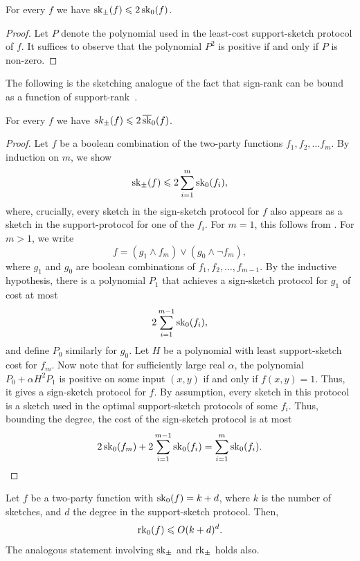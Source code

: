 \documentclass{article}
\begin{document}
\begin{boxproposition}\label{prop:support-to-sign}
    For every $f$ we have $\operatorname{sk}_\pm(f) \leqslant 2\operatorname{sk}_0(f)$.
\end{boxproposition}

\begin{proof}
    Let $P$ denote the polynomial used in the least-cost support-sketch protocol of $f$. It suffices to observe that the polynomial $P^2$ is positive if and only if $P$ is non-zero.
\end{proof}

The following is the sketching analogue of the fact that sign-rank can be bound as a function of support-rank~\cite[Lemma II.3]{GHIS25}.

\begin{boxproposition}
    For every $f$ we have $sk_\pm(f) \leqslant 2\operatorname{\overline{sk}}_0(f)$.
\end{boxproposition}

\begin{proof}
    Let $f$ be a boolean combination of the two-party functions $f_1,f_2,\dots f_m$. By induction on $m$, we show
    \[
        \operatorname{sk}_\pm(f) \leqslant 2\sum_{i = 1}^m \operatorname{sk}_0(f_i),
    \]
    where, crucially, every sketch in the sign-sketch protocol for $f$ also appears as a sketch in the support-protocol for one of the $f_i$. For $m = 1$, this follows from . For $m > 1$, we write
    \[
        f = (g_1 \wedge f_m) \vee (g_0 \wedge \neg f_m),
    \]
    where $g_1$ and $g_0$ are boolean combinations of $f_1,f_2,\dots, f_{m-1}$. By the inductive hypothesis, there is a polynomial $P_1$ that achieves a sign-sketch protocol for $g_1$ of cost at most
    \[
        2\sum_{i = 1}^{m-1} \operatorname{sk}_0(f_i),
    \]
    and define $P_0$ similarly for $g_0$. 
    Let $H$ be a polynomial with least support-sketch cost for $f_m$. Now note that for sufficiently large real $\alpha$, the polynomial $P_0 + \alpha H^2P_1$ is positive on some input $(x,y)$ if and only if $f(x,y) = 1$. Thus, it gives a sign-sketch protocol for $f$. By assumption, every sketch in this protocol is a sketch used in the optimal support-sketch protocols of some $f_i$. Thus, bounding the degree, the cost of the sign-sketch protocol is at most
    \[
        2\operatorname{sk}_0(f_m) + 2\sum_{i = 1}^{m-1} \operatorname{sk}_0(f_i) = \sum_{i = 1}^{m} \operatorname{sk}_0(f_i).
    \]
\end{proof}

\begin{boxproposition}\label{lem:sketch-to-rank}
    Let $f$ be a two-party function with $\operatorname{sk}_0(f) = k+d$, where $k$ is the number of sketches, and $d$ the degree in the support-sketch protocol. Then,
    \[
        \operatorname{rk}_0(f) \leqslant  O(k+d)^d.
    \]
    The analogous statement involving $\operatorname{sk}_\pm$ and $\operatorname{rk}_\pm$ holds also.
\end{boxproposition}
\end{document}
